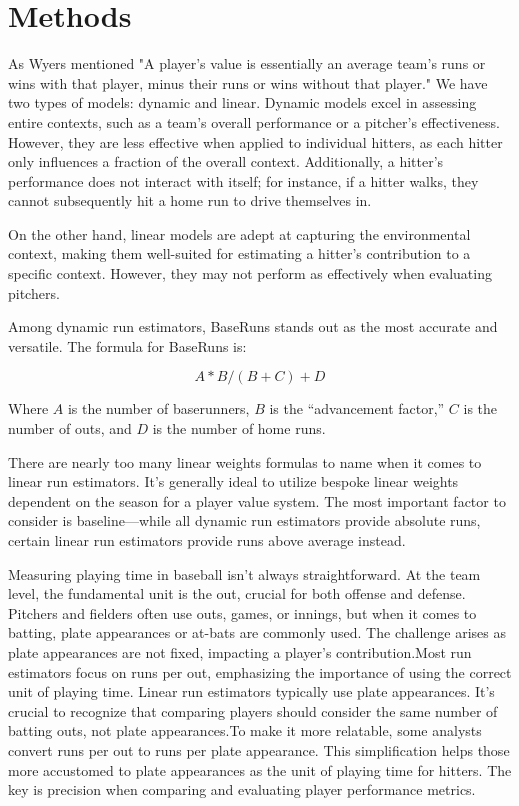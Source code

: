 \documentclass[12pt]{article}
\begin{document}
\section{Methods}
\label{sec:meth}

As Wyers mentioned  "A player's value is essentially an average team's 
runs or wins with that player, minus their runs or wins without that player." \citep*{web:Wyers:Part2} We have two 
types of models: dynamic and linear. Dynamic models excel in assessing entire contexts, such as a team's overall performance or 
a pitcher's effectiveness. However, they are less effective when applied to individual hitters, as each hitter 
only influences a fraction of the overall context. Additionally, a hitter's performance 
does not interact with itself; for instance, if a hitter walks, they cannot subsequently hit a home run to drive 
themselves in.

On the other hand, linear models are adept at capturing the environmental context, making them 
well-suited for estimating a hitter's contribution to a specific context. However, they may not perform as 
effectively when evaluating pitchers. 

Among dynamic run estimators, BaseRuns stands out as the most accurate and versatile. The formula for BaseRuns is:

\begin{equation}
  \label{eq:baseRuns}
A*B/(B + C) + D
\end{equation}

Where $A$ is the number of baserunners, $B$ is the “advancement factor,” $C$ is the number of outs, and $D$ is the 
number of home runs.

There are nearly too many linear weights formulas to name when it comes to linear run estimators. It's generally 
ideal to utilize bespoke linear weights dependent on the season for a player value system. The most important 
factor to consider is baseline—while all dynamic run estimators provide absolute runs, certain linear run estimators
provide runs above average instead. 

Measuring playing time in baseball isn't always straightforward. At the team level, the fundamental unit is the
out, crucial for both offense and defense. Pitchers and fielders often use outs, games, or innings, but when 
it comes to batting, plate appearances or at-bats are commonly used. The challenge arises as plate appearances 
are not fixed, impacting a player's contribution.Most run estimators focus on runs per out,
emphasizing the importance of using the correct unit of playing 
time. Linear run estimators typically use plate appearances. It's crucial to recognize that comparing players 
should consider the same number of batting outs, not plate appearances.To make it more relatable, 
some analysts convert runs per out to runs per plate appearance. This simplification 
helps those more accustomed to plate appearances as the unit of playing time for hitters. The key is precision 
when comparing and evaluating player performance metrics.
\end{document}

